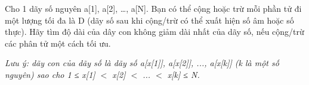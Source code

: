 Cho 1 dãy số nguyên a[1], a[2], …, a[N]. Bạn có thể cộng hoặc trừ mỗi phần tử đi một lượng tối đa là D (dãy số sau khi cộng/trừ có thể xuất hiện số âm hoặc số thực). Hãy tìm độ dài của dây con không giảm dài nhất của dãy số, nếu cộng/trừ các phân tử một cách tối ưu.  

\emph{    Lưu ý: dãy con của dãy số là dãy số a[x[1]], a[x[2]], ..., a[x[k]] (k là một số nguyên) sao cho 1 ≤ x[1] $<$ x[2] $<$ ... $<$ x[k] ≤ N.   }